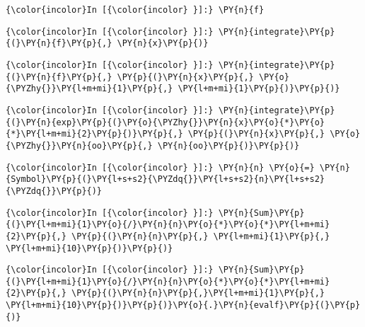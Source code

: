     \begin{Verbatim}[commandchars=\\\{\}]
{\color{incolor}In [{\color{incolor} }]:} \PY{n}{f}
\end{Verbatim}

    \begin{Verbatim}[commandchars=\\\{\}]
{\color{incolor}In [{\color{incolor} }]:} \PY{n}{integrate}\PY{p}{(}\PY{n}{f}\PY{p}{,} \PY{n}{x}\PY{p}{)}
\end{Verbatim}



    \begin{Verbatim}[commandchars=\\\{\}]
{\color{incolor}In [{\color{incolor} }]:} \PY{n}{integrate}\PY{p}{(}\PY{n}{f}\PY{p}{,} \PY{p}{(}\PY{n}{x}\PY{p}{,} \PY{o}{\PYZhy{}}\PY{l+m+mi}{1}\PY{p}{,} \PY{l+m+mi}{1}\PY{p}{)}\PY{p}{)}
\end{Verbatim}



    \begin{Verbatim}[commandchars=\\\{\}]
{\color{incolor}In [{\color{incolor} }]:} \PY{n}{integrate}\PY{p}{(}\PY{n}{exp}\PY{p}{(}\PY{o}{\PYZhy{}}\PY{n}{x}\PY{o}{*}\PY{o}{*}\PY{l+m+mi}{2}\PY{p}{)}\PY{p}{,} \PY{p}{(}\PY{n}{x}\PY{p}{,} \PY{o}{\PYZhy{}}\PY{n}{oo}\PY{p}{,} \PY{n}{oo}\PY{p}{)}\PY{p}{)}
\end{Verbatim}







    \begin{Verbatim}[commandchars=\\\{\}]
{\color{incolor}In [{\color{incolor} }]:} \PY{n}{n} \PY{o}{=} \PY{n}{Symbol}\PY{p}{(}\PY{l+s+s2}{\PYZdq{}}\PY{l+s+s2}{n}\PY{l+s+s2}{\PYZdq{}}\PY{p}{)}
\end{Verbatim}

    \begin{Verbatim}[commandchars=\\\{\}]
{\color{incolor}In [{\color{incolor} }]:} \PY{n}{Sum}\PY{p}{(}\PY{l+m+mi}{1}\PY{o}{/}\PY{n}{n}\PY{o}{*}\PY{o}{*}\PY{l+m+mi}{2}\PY{p}{,} \PY{p}{(}\PY{n}{n}\PY{p}{,} \PY{l+m+mi}{1}\PY{p}{,} \PY{l+m+mi}{10}\PY{p}{)}\PY{p}{)}
\end{Verbatim}

    \begin{Verbatim}[commandchars=\\\{\}]
{\color{incolor}In [{\color{incolor} }]:} \PY{n}{Sum}\PY{p}{(}\PY{l+m+mi}{1}\PY{o}{/}\PY{n}{n}\PY{o}{*}\PY{o}{*}\PY{l+m+mi}{2}\PY{p}{,} \PY{p}{(}\PY{n}{n}\PY{p}{,}\PY{l+m+mi}{1}\PY{p}{,} \PY{l+m+mi}{10}\PY{p}{)}\PY{p}{)}\PY{o}{.}\PY{n}{evalf}\PY{p}{(}\PY{p}{)}
\end{Verbatim}

